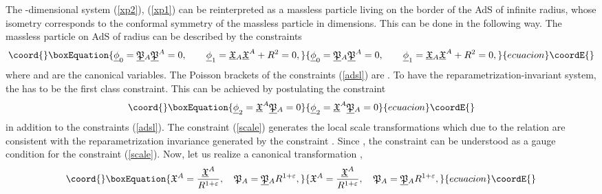 \documentclass[a4paper,12pt]{article}
\def\X{\mathfrak X}
\def\P{\mathfrak P}
\begin{document}
The \coordHE{}-dimensional system
(\ref{xp2}), (\ref{xp1})
can be reinterpreted
as a massless particle living on
the
border of the AdS\coordHE{} of infinite radius,
whose isometry corresponds to the
conformal symmetry of the massless particle
in \coordHE{} dimensions.
This can be done in the following way.
The massless particle
on AdS\coordHE{} of radius \coordHE{}
can be described by the
constraints
\begin{equation}\coord{}\boxEquation{
\underline{\phi}_0=\underline{\P}{}_A
\underline{\P}{}^A=0,\qquad
\underline{\phi}_1=\underline{\X}{}_A\underline{\X}^A+R^2=0,
\label{adsl}
}{
\underline{\phi}_0=\underline{\P}{}_A
\underline{\P}{}^A=0,\qquad
\underline{\phi}_1=\underline{\X}{}_A\underline{\X}^A+R^2=0,
}{ecuacion}\coordE{}\end{equation}
where \myHighlight{$\underline{\X}^A$}\coordHE{} and
\myHighlight{$\underline{\P}{}_A$}\coordHE{} are the canonical variables.
The Poisson brackets of
the constraints (\ref{adsl})
are \myHighlight{$\{\underline{\phi}_1,\underline{\phi}_0\}=
4\underline{\X}^A\underline{\P}{}_A$}\coordHE{}.
To have the reparametrization-invariant system,
the \coordHE{} has to be
the first class constraint.
This can be achieved by
postulating the constraint
\begin{equation}\coord{}\boxEquation{
\underline{\phi}_2=\underline{\X}^A\underline{\P}{}_A=0
\label{scale}
}{
\underline{\phi}_2=\underline{\X}^A\underline{\P}{}_A=0
}{ecuacion}\coordE{}\end{equation}
in addition to the constraints (\ref{adsl}).
The constraint (\ref{scale}) generates
the local scale transformations
which due to the relation \coordHE{}
are consistent with the
reparametrization invariance
generated by the constraint \coordHE{}.
Since
\coordHE{},
the constraint \coordHE{} can be understood
as a gauge condition for the constraint
(\ref{scale}).
Now, let us realize a canonical transformation
\myHighlight{$(\underline{\X}^A,\underline{\P}_A)
\rightarrow
(\X^A,\P_A)$}\coordHE{},
\begin{equation}\coord{}\boxEquation{
\X^A=\frac{\underline{\X}^A}{R^{1+\varepsilon}},
\quad
\P_A=\underline{\P}{}_AR^{1+\varepsilon},
\label{trick}
}{
\X^A=\frac{\underline{\X}^A}{R^{1+\varepsilon}},
\quad
\P_A=\underline{\P}{}_AR^{1+\varepsilon},
}{ecuacion}\coordE{}\end{equation}
\end{document}
